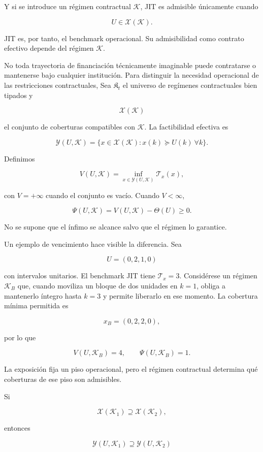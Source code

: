 \documentclass[10pt,a5paper,twoside]{article}
\begin{document}
Y si se introduce un régimen contractual \(\mathcal K\), JIT es
admisible únicamente cuando

\[
U\in\mathcal X(\mathcal K).
\]

JIT es, por tanto, el benchmark operacional. Su admisibilidad como
contrato efectivo depende del régimen \(\mathcal K\).

No toda trayectoria de financiación técnicamente imaginable puede contratarse o
mantenerse bajo cualquier institución. Para distinguir la necesidad operacional de las
restricciones contractuales, Sea \(\mathfrak K_t\) el universo de regímenes contractuales bien
tipados y

\[
\mathcal X(\mathcal K)
\]

el conjunto de coberturas compatibles con \(\mathcal K\). La
factibilidad efectiva es

\[
\mathcal Y(U,\mathcal K)
=
\{x\in\mathcal X(\mathcal K):x(k)\succeq U(k)\ \forall k\}.
\]

Definimos

\[
V(U,\mathcal K)
=
\inf_{x\in\mathcal Y(U,\mathcal K)}
\mathcal T_x(x),
\]

con \(V=+\infty\) cuando el conjunto es vacío. Cuando \(V<\infty\),

\[
\Psi(U,\mathcal K)
=
V(U,\mathcal K)-\Theta(U)\ge0.
\]

No se supone que el ínfimo se alcance salvo que el régimen lo garantice.

Un ejemplo de vencimiento hace visible la diferencia. Sea

\[
U=(0,2,1,0)
\]

con intervalos unitarios. El benchmark JIT tiene \(\mathcal T_x=3\).
Considérese un régimen \(\mathcal K_B\) que, cuando moviliza un bloque
de dos unidades en \(k=1\), obliga a mantenerlo íntegro hasta \(k=3\) y
permite liberarlo en ese momento. La cobertura mínima permitida es

\[
x_B=(0,2,2,0),
\]

por lo que

\[
V(U,\mathcal K_B)=4,
\qquad
\Psi(U,\mathcal K_B)=1.
\]

La exposición fija un piso operacional, pero el régimen contractual
determina qué coberturas de ese piso son admisibles.

Si

\[
\mathcal X(\mathcal K_1)\supseteq\mathcal X(\mathcal K_2),
\]

entonces

\[
\mathcal Y(U,\mathcal K_1)\supseteq\mathcal Y(U,\mathcal K_2)
\]
\end{document}
